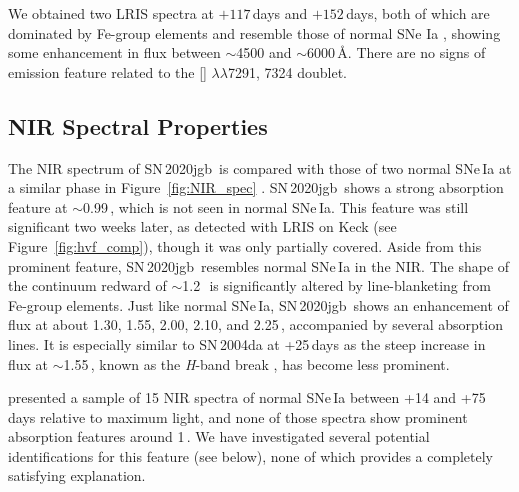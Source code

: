 \documentclass[twocolumn]{aastex631}
\newcommand{\sn}{SN\,2020jgb}
\begin{document}
\begin{CJK*}{UTF8}{gbsn}
We obtained two LRIS spectra at $+117$\,days and $+152$\,days, both of which are dominated by Fe-group elements and resemble those of normal SNe Ia \citep[e.g., SN\,2011fe;][]{Mazzali_2015}, showing some enhancement in flux between $\sim$4500 and $\sim$6000\,\AA. There are no signs of emission feature related to the [] $\lambda\lambda$7291, 7324 doublet.

\subsection{NIR Spectral Properties}
\label{sec:NIR_spec}
The NIR spectrum of \sn\ is compared with those of two normal SNe\,Ia at a similar phase in Figure~\ref{fig:NIR_spec} \citep[data for SN\,2004ab and SN\,2004da from][]{Marion2009_NIR}. \sn\ shows a strong absorption feature at $\sim$0.99\,\micron, which is not seen in normal SNe\,Ia. This feature was still significant two weeks later, as detected with LRIS on Keck (see Figure~\ref{fig:hvf_comp}), though it was only partially covered. Aside from this prominent feature, \sn\ resembles normal SNe\,Ia in the NIR. The shape of the continuum redward of $\sim$1.2\,\micron\ is significantly altered by line-blanketing from Fe-group elements. Just like normal SNe\,Ia, \sn\ shows an enhancement of flux at about 1.30, 1.55, 2.00, 2.10, and 2.25\,\micron, accompanied by several  absorption lines. It is especially similar to SN\,2004da at +25\,days as the steep increase in flux at $\sim$1.55\,\micron, known as the \textit{H}-band break \citep{Hsiao_CSP_2019}, has become less prominent.

\citet{Marion2009_NIR} presented a sample of 15 NIR spectra of normal SNe\,Ia between +14 and +75\,days relative to maximum light, and none of those spectra show prominent absorption features around 1\,\micron. We have investigated several potential identifications for this feature (see below), none of which provides a completely satisfying explanation.


\end{CJK*}
\end{document}
